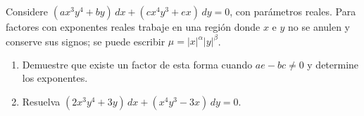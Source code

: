 Considere $(ax^3y^4+by)\,dx+(cx^4y^3+ex)\,dy=0$, con parámetros reales. Para factores con exponentes reales trabaje en una región donde $x$ e $y$ no se anulen y conserve sus signos; se puede escribir $\mu=|x|^{\alpha}|y|^{\beta}$.

\begin{enumerate}[label=(\alph*),ref=\alph*,leftmargin=*]
\item Demuestre que existe un factor de esta forma cuando $ae-bc\ne0$ y determine los exponentes.
\item Resuelva $(2x^3y^4+3y)\,dx+(x^4y^3-3x)\,dy=0$.
\end{enumerate}
